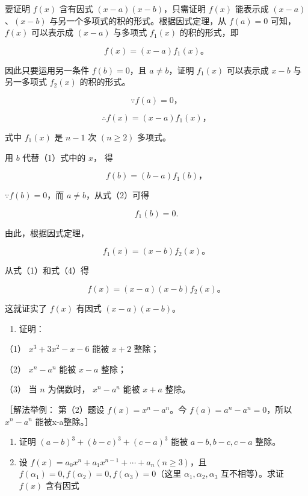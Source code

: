  要证明 \(f(x)\) 含有因式 \((x - a)(x - b)\)，只需证明
\(f(x)\) 能表示成 \((x - a)\)、\((x - b)\)
与另一个多项式的积的形式。根据因式定理，从 \(f(a) = 0\) 可知，\(f(x)\)
可以表示成 \((x - a)\) 与多项式 \(f_1(x)\) 的积的形式，即

\[
f (x) = (x - a) f _ {1} (x)\text{。}
\]

因此只要运用另一条件 \(f(b) = 0\)，且 \(a \neq b\)，证明 \(f_{1}(x)\)
可以表示成 \(x - b\) 与另一多项式 \(f_{2}(x)\) 的积的形式。


\[
\because f (a) = 0\text{，}
\]

\[
\therefore f (x) = (x - a) f _ {1} (x)\text{，} \tag {1}
\]

式中 \(f_{1}(x)\) 是 \(n - 1\) 次 \((n\geqslant 2)\) 多项式。

用 \(b\) 代替（1）式中的 \(x\)， 得

\[
f (b) = (b - a) f _ {1} (b)\text{，} \tag {2}
\]

\(\because f(b) = 0\)，而 \(a \neq b\)，从式（2）可得

\[
f _ {1} (b) = 0. \tag {3}
\]

由此，根据因式定理，

\[
f _ {1} (x) = (x - b) f _ {2} (x)\text{。} \tag {4}
\]

从式（1）和式（4）得

\[
f (x) = (x - a) (x - b) f _ {2} (x)\text{。}
\]

这就证实了 \(f(x)\) 有因式 \((x - a)(x - b)\)。

\begin{enumerate}
\item
  证明：
\end{enumerate}

（1） \(x^{3} + 3x^{2} - x - 6\) 能被 \(x + 2\) 整除；

（2） \(x^{n} - a^{n}\) 能被 \(x - a\) 整除；

（3） 当 \(n\) 为偶数时， \(x^n - a^n\) 能被 \(x + a\) 整除。

［解法举例： 第（2）题设 \(f(x)=x^{n}-a^{n}\)。今
\(f(a)=a^{n}-a^{n}=0\)，所以 \(x^{n}-a^{n}\) 能被x-a整除。］

\begin{enumerate}[start=2]
\item
  证明 \((a - b)^3 + (b - c)^3 + (c - a)^3\) 能被
  \(a - b, b - c, c - a\) 整除。
\item
  设 \(f(x) = a_0 x^n + a_1 x^{n-1} + \cdots + a_n (n \geqslant 3)\)，且
  \(f(\alpha_1) = 0, f(\alpha_2) = 0, f(\alpha_3) = 0\)（这里
  \(\alpha_1, \alpha_2, \alpha_3\) 互不相等）。求证 \(f(x)\) 含有因式
\end{enumerate}

